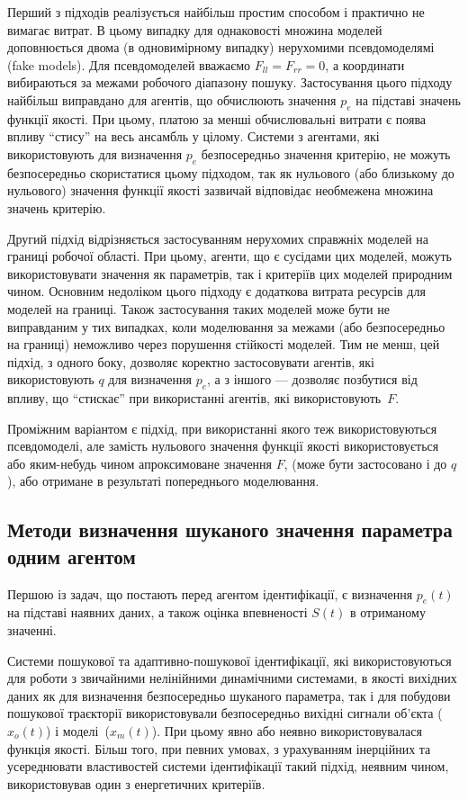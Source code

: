 Перший з підходів реалізується найбільш простим способом і
практично не вимагає витрат. В цьому випадку для однаковості
множина моделей доповнюється двома (в одновимірному випадку)
нерухомими псевдомоделямі (fake models). Для псевдомоделей вважаємо
$ F_{ll} = F_{rr} = 0 $, а координати вибираються за межами робочого
діапазону пошуку. Застосування цього підходу найбільш
виправдано для агентів, що обчислюють значення
$p_e$ на підставі значень функції якості. При цьому, платою за менші обчислювальні
витрати є поява  впливу ``стису'' на весь ансамбль у
цілому. Системи з агентами, які використовують для визначення
$p_e$ безпосередньо значення критерію, не можуть безпосередньо
скористатися цьому підходом, так як нульового (або близькому
до нульового) значення функції якості зазвичай відповідає
необмежена множина значень критерію.

Другий підхід відрізняється застосуванням нерухомих
справжніх моделей на границі робочої області. При цьому,
агенти, що є сусідами цих моделей, можуть використовувати
значення як параметрів, так і критеріїв цих моделей природним
чином. Основним недоліком цього підходу є додаткова витрата
ресурсів для моделей на границі. Також застосування таких
моделей може бути не виправданим у  тих випадках, коли моделювання за межами
(або безпосередньо на границі) неможливо через порушення
стійкості моделей. Тим не менш, цей підхід, з одного боку,
дозволяє коректно застосовувати агентів, які використовують
$q$ для визначення $p_e$,
а з іншого --- дозволяє позбутися від впливу, що ``стискає'' при
використанні агентів, які використовують~$F$.

Проміжним варіантом є підхід, при використанні якого
теж використовуються псевдомоделі, але замість нульового
значення функції якості використовується або яким-небудь чином
апроксимоване значення
$ F $, (може бути застосовано і до $q$),
або отримане в результаті попереднього моделювання.




\subsection{Методи визначення шуканого значення параметра одним агентом} %

Першою із задач, що постають перед агентом ідентифікації, є визначення $p_e(t)$
на підставі наявних даних, а також оцінка впевненості $S(t)$ в
отриманому значенні.

Системи пошукової та адаптивно-пошукової ідентифікації,
які використовуються для роботи з звичайними нелінійними
динамічними системами, в якості вихідних даних як для визначення
безпосередньо шуканого параметра, так і для побудови пошукової
траєкторії використовували безпосередньо вихідні сигнали
об'єкта ($x_o(t)$) і моделі~($x_m(t)$).
При цьому явно або неявно використовувалася функція
якості. Більш того, при певних умовах, з урахуванням інерційних
та усереднювати властивостей системи ідентифікації такий
підхід, неявним чином, використовував один з енергетичних
критеріїв.

